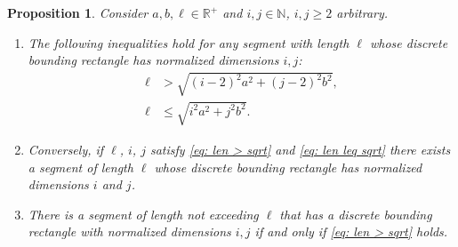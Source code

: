 \documentclass[12pt, a4paper]{article}
\newcommand{\len}{\ell} %
\newtheorem{proposition}{Proposition}%
\begin{document}
\begin{proposition}
\label{prop: len ineq i j}
Consider $a, b, \len \in \mathbb R^+$ and $i, j \in \mathbb N$, $i, j \geq 2$ arbitrary.
\begin{enumerate}
\item
\label{prop: len ineq i j: ineqs}
The following inequalities hold for any segment with length $\len$ whose discrete bounding rectangle has normalized dimensions $i, j$:
\begin{align}
\label{eq: len > sqrt}
\len &> \sqrt{(i-2)^2 a^2 + (j-2)^2 b^2}, \\
\label{eq: len leq sqrt}
\len &\leq \sqrt{i^2 a^2 + j^2 b^2}.
\end{align}
\item
\label{prop: len ineq i j: exist}
Conversely, if $\len$, $i$, $j$ satisfy \eqref{eq: len > sqrt} and \eqref{eq: len leq sqrt} there exists a segment of length $\len$ whose discrete bounding rectangle has normalized dimensions $i$ and $j$.
\item
\label{prop: len ineq i j: ineq, exist}
There is a segment of length not exceeding $\len$ that has a discrete bounding rectangle with normalized dimensions $i, j$ if and only if \eqref{eq: len > sqrt} holds.
\end{enumerate}
\end{proposition}
\end{document}
